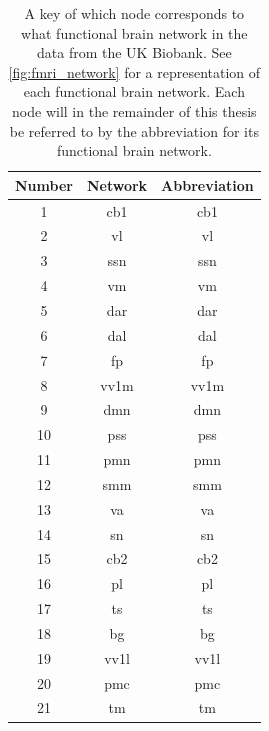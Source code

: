 \begin{table}[!htbp]
    \centering
    \caption{A key  of which node corresponds to what functional brain network in the data from the UK Biobank. See \cref{fig:fmri_network} for a representation of each functional brain network. Each node will in the remainder of this thesis be referred to by the abbreviation for its functional brain network.}
    \begin{tabular}{||c|c|c||}
        \hline
        Number & Network & Abbreviation  \\ \hline\hline
        1 & \acrlong{cb1} & \acrshort{cb1} \\ \hline
        2 & \acrlong{vl} & \acrshort{vl}  \\ \hline
        3 & \acrlong{ssn} & \acrshort{ssn} \\ \hline
        4 & \acrlong{vm} &  \acrshort{vm}\\ \hline
        5 & \acrlong{dar} & \acrshort{dar} \\ \hline
        6 & \acrlong{dal} &  \acrshort{dal} \\ \hline
        7 & \acrlong{fp} &  \acrshort{fp}\\ \hline
        8 & \acrlong{vv1m} & \acrshort{vv1m} \\ \hline
        9 & \acrlong{dmn} &  \acrshort{dmn} \\ \hline
        10 & \acrlong{pss} & \acrshort{pss} \\ \hline
        11 & \acrlong{pmn} & \acrshort{pmn} \\ \hline
        12 & \acrlong{smm} & \acrshort{smm}  \\ \hline
        13 & \acrlong{va} &  \acrshort{va}\\ \hline
        14 & \acrlong{sn} &  \acrshort{sn}\\ \hline
        15 & \acrlong{cb2} & \acrshort{cb2} \\ \hline
        16 & \acrlong{pl} & \acrshort{pl} \\ \hline
        17 & \acrlong{ts} & \acrshort{ts} \\ \hline
        18 & \acrlong{bg} &  \acrshort{bg} \\ \hline
        19 & \acrlong{vv1l} & \acrshort{vv1l} \\ \hline
        20 & \acrlong{pmc} & \acrshort{pmc} \\ \hline
        21 & \acrlong{tm} & \acrshort{tm} \\ \hline
    \end{tabular}
    \label{tab:Networks}
\end{table}


